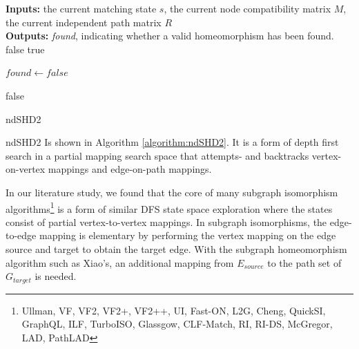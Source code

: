 \begin{algorithm}
\SetAlgoLined
\textbf{Inputs: } the current matching state $s$, the current node compatibility matrix $M$, the current independent path matrix $R$\\
\textbf{Outputs: } \textit{found}, indicating whether a valid homeomorphism has been found.\\
 {
	\Return false\;
}  {
	\Return true\;
}

$\mathit{found} \longleftarrow \mathit{false}$

 \Return false\;
 \caption{ndSHD2}
 \label{algorithm:ndSHD2}
\end{algorithm}

ndSHD2 Is shown in Algorithm \ref{algorithm:ndSHD2}. It is a form of depth first search in a partial mapping search space that attempts- and backtracks vertex-on-vertex mappings and edge-on-path mappings.

In our literature study, we found that the core of many subgraph isomorphism algorithms\footnote{Ullman, VF, VF2, VF2+, VF2++, UI, Fast-ON, L2G, Cheng, QuickSI, GraphQL, ILF, TurboISO, Glassgow, CLF-Match, RI, RI-DS, McGregor, LAD, PathLAD} is a form of similar DFS state space exploration where the states consist of partial vertex-to-vertex mappings. In subgraph isomorphisms, the edge-to-edge mapping is elementary by performing the vertex mapping on the edge source and target to obtain the target edge. With the subgraph homeomorphism algorithm such as Xiao's, an additional mapping from $E_{source}$ to the path set of $G_{target}$ is needed.

